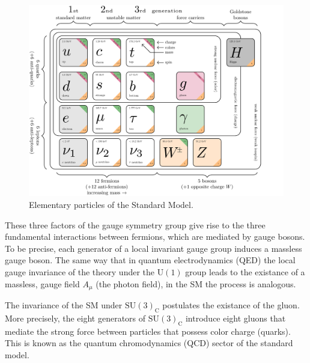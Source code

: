\begin{figure}[!ht]
    \vspace*{-0.0cm}
    \centering
    \setlength{\mylength}{\textwidth}
    \includegraphics[width=0.8\mylength]{resources/SM.png}
    \vspace*{-0.0cm}
    \caption{Elementary particles of the Standard Model.}
    \label{fig:SM}
    \vspace*{-0.0cm}
\end{figure}

These three factors of the gauge symmetry group give rise to the three fundamental interactions between fermions, which are mediated by gauge bosons. To be precise, each generator of a local invariant gauge group induces a massless gauge boson. The same way that in quantum electrodynamics (QED) the local gauge invariance of the theory under the $\text{U}(1)$ group leads to the existance of a massless, gauge field $A_\mu$ (the photon field), in the SM the process is analogous.

The invariance of the SM under $\text{SU}(3)_{\text{C}}$ postulates the existance of the gluon. More precisely, the eight generators of $\text{SU}(3)_{\text{C}}$ introduce eight gluons that mediate the strong force between particles that possess color charge (quarks). This is known as the quantum chromodynamics (QCD) sector of the standard model.

